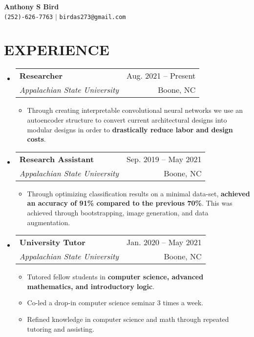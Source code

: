 \documentclass[letterpaper,11pt]{article}
\makeatletter
\newcommand{\resumeItem}[1]{
  \item\small{
    {#1 \vspace{-1pt}}
  }
}
\newcommand{\resumeSubheading}[4]{
  \vspace{-1pt}\item
    \begin{tabular*}{\textwidth}[t]{l@{\extracolsep{\fill}}r}
      \textbf{#1} & {\color{dark-grey}\small #2}\vspace{1pt}\\ %
      \textit{#3} & {\color{dark-grey} \small #4}\\ %
    \end{tabular*}\vspace{-4pt}
}
\newcommand{\resumeSubHeadingListStart}{\begin{itemize}[leftmargin=0in, label={}]}
\newcommand{\resumeSubHeadingListEnd}{\end{itemize}}
\newcommand{\resumeItemListStart}{\begin{itemize}}
\newcommand{\resumeItemListEnd}{\end{itemize}\vspace{0pt}}
\makeatother
\begin{document}
\begin{center}
    \textbf{\Large Anthony S Bird} \\ \vspace{5pt}
    \small \faPhone* \texttt{(252)-626-7763} \hspace{1pt} $|$
    \hspace{1pt} \faEnvelope \hspace{2pt} \texttt{birdas273@gmail.com} \hspace{1pt}
    \\ \vspace{-3pt}
\end{center}

\section{EXPERIENCE}
  \resumeSubHeadingListStart
    
    \resumeSubheading
      {Researcher}{Aug. 2021 -- Present}
      {Appalachian State University}{Boone, NC}
      \resumeItemListStart
        \resumeItem{Through creating interpretable convolutional neural networks we use an autoencoder structure to convert current architectural designs into modular designs in order to \textbf{drastically reduce labor and design costs}.}
      \resumeItemListEnd
    
    \resumeSubheading
      {Research Assistant}{Sep. 2019 -- May 2021}
      {Appalachian State University}{Boone, NC}
      \resumeItemListStart
        \resumeItem{Through optimizing classification results on a minimal data-set, \textbf{achieved an accuracy of 91\% compared to the previous 70\%}. This was achieved through bootstrapping, image generation, and data augmentation.}
      \resumeItemListEnd
      
    \resumeSubheading
        {University Tutor}{Jan. 2020 -- May 2021}
        {Appalachian State University}{Boone, NC}
        \resumeItemListStart
          \resumeItem{Tutored fellow students in \textbf{computer science, advanced mathematics, and introductory logic}.}
          \resumeItem{Co-led a drop-in computer science seminar 3 times a week.}
          \resumeItem{Refined knowledge in computer science and math through repeated tutoring and assisting.}
        \resumeItemListEnd
        
      
  \resumeSubHeadingListEnd



\end{document}
